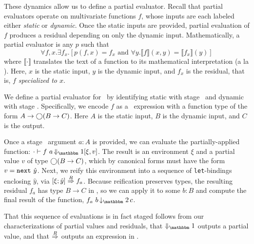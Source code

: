 These dynamics allow us to define a partial evaluator.
Recall that partial evaluators operate on multivariate functions $f$, whose
inputs are each labeled either {\em static} or {\em dynamic}. Once the static
inputs are provided, partial evaluation of $f$ produces a residual depending on
only the dynamic input. Mathematically, a partial evaluator is any $p$ such
that
\[
	\forall f,x. \exists f_x. [p(f,x) = f_x \text{ and } \forall y.\llbracket f \rrbracket(x,y)=\llbracket f_x \rrbracket(y)]
\]
where $\llbracket \cdot \rrbracket$ translates the text of a function to its
mathematical interpretation (a la \cite{jones96}). Here, $x$ is the static
input, $y$ is the dynamic input, and $f_x$ is the residual, that is, \emph{$f$
specialized to $x$}.


We define a partial evaluator for \lang\ by identifying static with stage
\bbone\ and dynamic with stage \bbtwo.  Specifically, we encode $f$ as a \lang\
expression with a function type of the form $A\to\bigcirc(B\to C)$.%
%
Here $A$ is the static input, $B$ is the dynamic input, and $C$ is the output.

Once a stage \bbone\ argument $a:A$ is provided, we can evaluate the partially-applied
function:
$\cdot\vdash f~a \mathop{\redonesym} [\xi,v]$.
The result is an environment $\xi$ and a partial value $v$ of type $\bigcirc(B\to
C)$, which by canonical forms must have the form $v = {\tt next}~\hat y$. 
Next, we reify this environment into a sequence of \verb|let|-bindings
enclosing $\hat y$, via $[{\xi};{\hat y}]\overset{R}\Rightarrow{f_a}$. 
Because reification preserves types, the resulting residual $f_a$ has type $B\to C$ in \langTwo, so we can apply it to some $b:B$
and compute the final result of the function, $f_a~b \mathop{\tworedsym} c$.

That this sequence of evaluations is in fact staged follows from our
characterizations of partial values and residuals, that $\redonesym$
outputs a partial value, and that $\overset{R}\Rightarrow$ outputs an expression in \langTwo.

